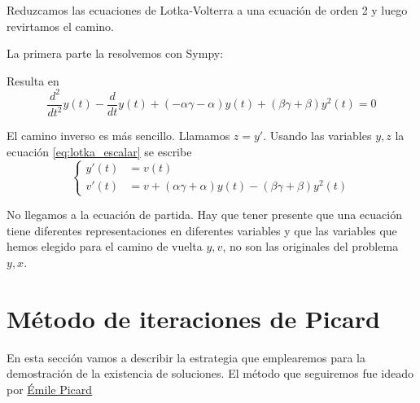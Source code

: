 \begin{ejemplo}{} Reduzcamos las ecuaciones de Lotka-Volterra a una ecuación de orden 2 y luego revirtamos el camino.

La primera parte la resolvemos con Sympy:

Resulta en
\begin{equation}\label{eq:lotka_escalar}\frac{d^{2}}{d t^{2}}  y{\left (t \right )- \frac{d}{d t} y{\left (t \right )} +
\left(- \alpha \gamma - \alpha\right) y{\left (t \right )} + \left(\beta \gamma + \beta\right) y^{2}{\left (t \right )} }=0
\end{equation}

El camino inverso es más sencillo. Llamamos $z=y'$. Usando las variables $y,z$ la ecuación \eqref{eq:lotka_escalar} se escribe
\[
 \left\{
 \begin{array}{ll}
    y'(t)&=v(t)\\
    v'(t)&=v+\left( \alpha \gamma + \alpha\right) y{\left (t \right )} - \left(\beta \gamma + \beta\right) y^{2}{\left (t \right )}
 \end{array}
 \right.
 \]

 No llegamos a la ecuación de partida. Hay que tener presente que una ecuación tiene diferentes representaciones en diferentes variables y que las variables que hemos elegido para el camino de vuelta $y,v$, no son las originales del problema $y,x$.


\end{ejemplo}


\section{Método de iteraciones de Picard}

En esta sección vamos a describir la estrategia que emplearemos para la demostración de la existencia de soluciones. El método que seguiremos fue ideado por \href{https://es.wikipedia.org/wiki/Charles_%C3%89mile_Picard}{Émile Picard} 

